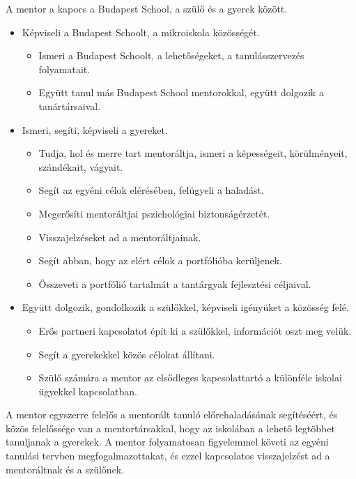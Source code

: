 A mentor a kapocs a Budapest School, a szülő és a gyerek között.

\begin{itemize}
  \item Képviseli a Budapest Schoolt, a mikroiskola közösségét.
        \begin{itemize}
          \item Ismeri a Budapest Schoolt, a lehetőségeket, a tanulásszervezés
                folyamatait.
          \item Együtt tanul más Budapest School mentorokkal, együtt dolgozik a
                tanártársaival.
        \end{itemize}

  \item Ismeri, segíti, képviseli a gyereket.
        \begin{itemize}
          \item  Tudja, hol és merre tart mentoráltja, ismeri a képességeit,
                körülményeit, szándékait, vágyait.
          \item    Segít az egyéni célok elérésében, felügyeli a haladást.
          \item    Megerősíti mentoráltjai pszichológiai biztonságérzetét.
          \item   Visszajelzéseket ad a mentoráltjainak.
          \item    Segít abban, hogy az elért célok a portfólióba kerüljenek.
          \item    Összeveti a portfólió tartalmát a tantárgyak fejlesztési
                céljaival.
        \end{itemize}

  \item Együtt dolgozik, gondolkozik a szülőkkel, képviseli igényüket a
        közösség felé.
        \begin{itemize}
          \item Erős partneri kapcsolatot épít ki a szülőkkel, információt oszt meg
                velük.
          \item Segít a gyerekekkel közös célokat állítani.
          \item Szülő számára a mentor az elsődleges kapcsolattartó a különféle
                iskolai ügyekkel kapcsolatban.
        \end{itemize}

\end{itemize}

A mentor egyszerre felelős a mentorált tanuló előrehaladásának segítéséért,
és
közös felelőssége van a mentortársakkal, hogy az iskolában a lehető legtöbbet
tanuljanak a gyerekek. A mentor folyamatosan figyelemmel követi az egyéni
tanulási tervben megfogalmazottakat, és ezzel kapcsolatos visszajelzést ad a
mentoráltnak és a szülőnek.

